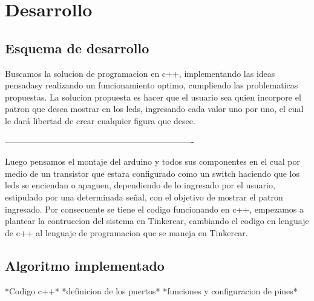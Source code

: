 \documentclass{article}
\begin{document}
\vspace{14cm}

\section{Desarrollo} \label{contenido}
\subsection{Esquema de desarrollo}

Buscamos la solucion de programacion en c++, implementando las ideas pensadasy realizando un funcionamiento optimo, cumpliendo las problematicas propuestas.
 \vspace{1cm}
La solucion propuesta es hacer que el usuario sea quien incorpore el patron que desea mostrar en los leds, ingresando cada valor uno por uno, el cual le dará libertad de crear cualquier figura que desee.


\space

 -------------------------------------------------------------------


Luego pensamos el montaje del arduino y todos sus componentes en el cual por medio de un transistor que estara configurado como un switch haciendo que los leds se enciendan o apaguen, dependiendo de lo ingresado por el usuario, estipulado por una determinada señal, con el objetivo de mostrar el patron ingresado.
 \vspace{1cm}
Por consecuente se tiene el codigo funcionando en c++, empezamos a plantear la contruccion del sistema en Tinkercar, cambiando el codigo en lenguaje de c++ al lenguaje de programacion que se maneja en Tinkercar.



 
  \vspace{5cm}
 






\vspace{8cm}

\subsection{Algoritmo implementado}

*Codigo c++*
*definicion de los puertos*
*funciones y configuracion de pines*

 \vspace{1cm}
 
\end{document}
